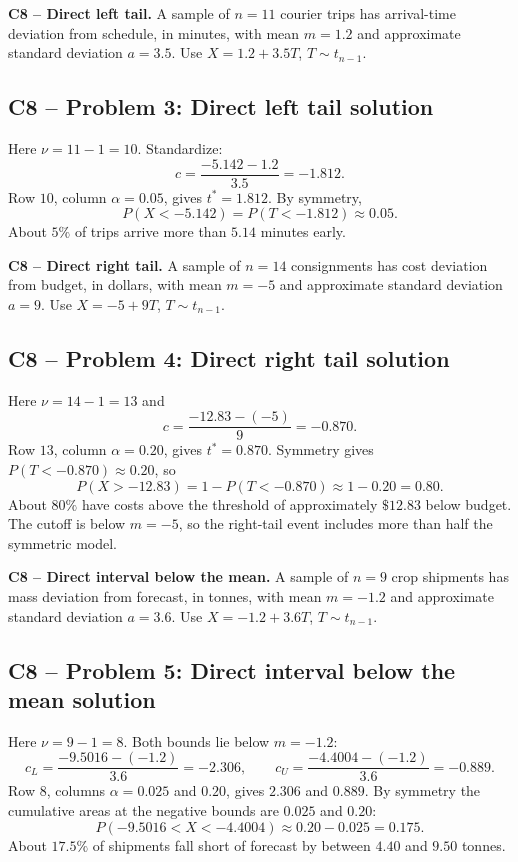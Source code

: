 {
\textbf{C8 -- Direct left tail.} A sample of $n=11$ courier trips has arrival-time deviation from schedule, in minutes, with mean $m=1.2$ and approximate standard deviation $a=3.5$. Use $X=1.2+3.5T$, $T\sim t_{n-1}$.
\label{sol:q3}
\subsection*{C8 -- Problem 3: Direct left tail solution }
Here $\nu=11-1=10$. Standardize:
\[
 c=\frac{-5.142-1.2}{3.5}=-1.812.
\]
Row $10$, column $\alpha=0.05$, gives $t^*=1.812$.
By symmetry,
\[
 P(X<-5.142)=P(T<-1.812)\approx\boxed{0.05}.
\]
About $5\%$ of trips arrive more than $5.14$ minutes early.
\secInicio[sec:q3]
}

{
\textbf{C8 -- Direct right tail.} A sample of $n=14$ consignments has cost deviation from budget, in dollars, with mean $m=-5$ and approximate standard deviation $a=9$. Use $X=-5+9T$, $T\sim t_{n-1}$.
\label{sol:q4}
\subsection*{C8 -- Problem 4: Direct right tail solution }
Here $\nu=14-1=13$ and
\[
 c=\frac{-12.83-(-5)}{9}=-0.870.
\]
Row $13$, column $\alpha=0.20$, gives $t^*=0.870$.
Symmetry gives $P(T<-0.870)\approx0.20$, so
\[
 P(X>-12.83)=1-P(T<-0.870)\approx1-0.20=\boxed{0.80}.
\]
About $80\%$ have costs above the threshold of approximately $\$12.83$ below budget.
The cutoff is below $m=-5$, so the right-tail event includes more than half the symmetric model.
\secInicio[sec:q4]
}

{
\textbf{C8 -- Direct interval below the mean.} A sample of $n=9$ crop shipments has mass deviation from forecast, in tonnes, with mean $m=-1.2$ and approximate standard deviation $a=3.6$. Use $X=-1.2+3.6T$, $T\sim t_{n-1}$.
\label{sol:q5}
\subsection*{C8 -- Problem 5: Direct interval below the mean solution }
Here $\nu=9-1=8$. Both bounds lie below $m=-1.2$:
\[
 c_L=\frac{-9.5016-(-1.2)}{3.6}=-2.306,\qquad c_U=\frac{-4.4004-(-1.2)}{3.6}=-0.889.
\]
Row $8$, columns $\alpha=0.025$ and $0.20$, gives $2.306$ and $0.889$.
By symmetry the cumulative areas at the negative bounds are $0.025$ and $0.20$:
\[
 P(-9.5016<X<-4.4004)\approx0.20-0.025=\boxed{0.175}.
\]
About $17.5\%$ of shipments fall short of forecast by between $4.40$ and $9.50$ tonnes.
\secInicio[sec:q5]
}

